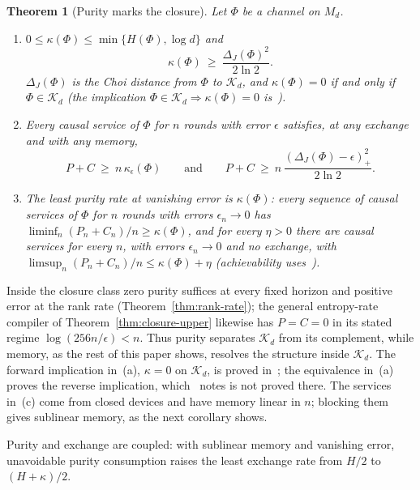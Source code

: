 \documentclass[11pt,a4paper]{article}
\theoremstyle{plain}
\newtheorem{theorem}{Theorem}[section]
\theoremstyle{definition}
\theoremstyle{remark}
\begin{document}
\begin{theorem}[Purity marks the closure]\label{thm:purity}
Let $\Phi$ be a channel on $M_d$.
\begin{enumerate}[label=(\alph*)]
\item $0\le\kappa(\Phi)\le\min\{H(\Phi),\log d\}$ and
\[
\kappa(\Phi)\ \ge\ \frac{\Delta_J(\Phi)^2}{2\ln2}.
\]
$\Delta_J(\Phi)$ is the Choi distance from $\Phi$ to $\mathcal K_d$, and $\kappa(\Phi)=0$ if and only if $\Phi\in\mathcal K_d$ (the
implication $\Phi\in\mathcal K_d\Rightarrow\kappa(\Phi)=0$ is~\cite[Section~8]{Douglas2026closed}).
\item Every causal service of $\Phi$ for $n$ rounds with error $\epsilon$ satisfies, at any exchange and with any memory,
\[
P+C\ \ge\ n\,\kappa_\epsilon(\Phi)\qquad\text{and}\qquad P+C\ \ge\ n\,\frac{(\Delta_J(\Phi)-\epsilon)_+^2}{2\ln2}.
\]
\item The least purity rate at vanishing error is $\kappa(\Phi)$: every sequence of causal services of $\Phi$ for $n$ rounds with errors
$\epsilon_n\to0$ has $\liminf_n(P_n+C_n)/n\ge\kappa(\Phi)$, and for every $\eta>0$ there are causal services for every $n$, with errors
$\epsilon_n\to0$ and no exchange, with $\limsup_n(P_n+C_n)/n\le\kappa(\Phi)+\eta$ (achievability
uses~\cite[Theorem~2.1]{Douglas2026closed}).
\end{enumerate}
\end{theorem}

Inside the closure class zero purity suffices at every fixed horizon and positive error at the rank rate (Theorem~\ref{thm:rank-rate});
the general entropy-rate compiler of Theorem~\ref{thm:closure-upper} likewise has $P=C=0$ in its stated regime $\log(256n/\epsilon)<n$.
Thus purity separates $\mathcal K_d$ from its complement, while memory, as the rest of this paper shows,
resolves the structure inside $\mathcal K_d$. The forward implication in~(a), $\kappa=0$ on $\mathcal K_d$, is proved
in~\cite[Section~8]{Douglas2026closed}; the equivalence in~(a) proves the reverse implication, which~\cite[Section~8]{Douglas2026closed}
notes is not proved there. The services in~(c) come from closed devices and have memory linear in $n$; blocking them
gives sublinear memory, as the next corollary shows.

Purity and exchange are coupled: with sublinear memory and vanishing error, unavoidable purity consumption raises the least exchange rate from
$H/2$ to $(H+\kappa)/2$.
\end{document}
